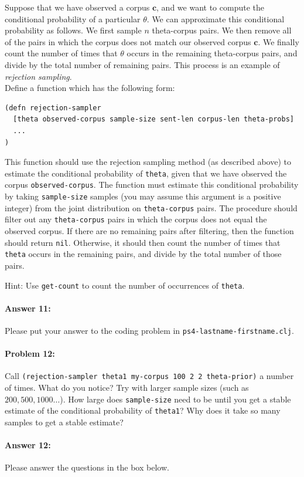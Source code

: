 \documentclass[10pt]{article}
\newenvironment{AnswerBox}{\begin{mdframed}[style=simple]}{\end{mdframed}}
\newcommand{\required}[1]{{\color{blue}{#1}}}
\newcommand{\PSnum}{4}
\begin{document}
 Suppose that we have observed a corpus $\mathbf{c}$, and we
want to compute the conditional probability of a particular $\theta$.
We can approximate this conditional probability as follows. We first
sample $n$ theta-corpus pairs. We then remove all of the pairs in
which the corpus does not match our observed corpus $\mathbf{c}$. We
finally count the number of times that $\theta$ occurs in the
remaining theta-corpus pairs, and divide by the total number of
remaining pairs. This process is an example of \textit{rejection sampling}.
\\

 Define a function \required{\texttt{rejection-sampler}}
which has the following form:
 
\begin{lstlisting}
(defn rejection-sampler
  [theta observed-corpus sample-size sent-len corpus-len theta-probs]
  ...
)
\end{lstlisting}

 This function should use the rejection sampling method (as
described above) to estimate the conditional probability of
\texttt{theta}, given that we have observed the corpus
\texttt{observed-corpus}. The function must estimate this conditional
probability by taking \texttt{sample-size} samples (you may assume
this argument is a positive integer) from the joint distribution on
\texttt{theta-corpus} pairs. The procedure should filter out any
\texttt{theta-corpus} pairs in which the corpus does not equal the
observed corpus. If there are no remaining pairs after filtering, then 
the function should return \texttt{nil}. Otherwise,
it should then count the number of times that \texttt{theta} occurs in the remaining pairs,
and divide by the total number of those pairs.

Hint: Use \texttt{get-count} to count the number of occurrences
of \texttt{theta}.

\paragraph{Answer 11:} Please put your answer to the coding problem in
\texttt{ps\PSnum-lastname-firstname.clj}.

\hrulefill %

\paragraph{Problem 12:}

Call \texttt{(rejection-sampler theta1 my-corpus 100 2 2 theta-prior)}
a number of times. What do you notice? Try with larger sample sizes
(such as $200, 500, 1000\ldots$). How large does
\texttt{sample-size} need to be until you get a stable estimate of the
conditional probability of \texttt{theta1}? Why does it take so many
samples to get a stable estimate?

\paragraph{Answer 12:} Please answer the questions in the box below.

\begin{AnswerBox}%

    
\end{AnswerBox}%
\end{document}
